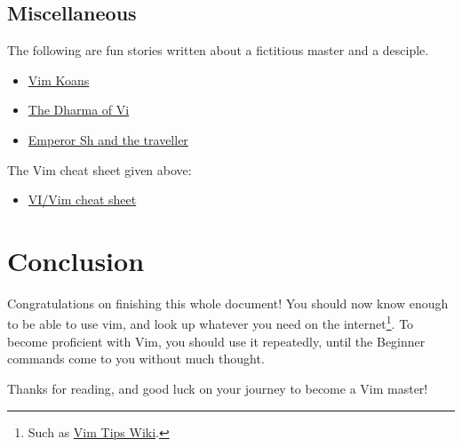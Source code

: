 \documentclass[11pt]{article}
\begin{document}
\subsection{Miscellaneous}
\label{sec:orge2c5ae4}
The following are fun stories written about a fictitious master
and a desciple.
\begin{itemize}
\item \href{https://sanctum.geek.nz/arabesque/vim-koans/}{Vim Koans}
\item \href{https://blog.samwhited.com/2015/04/the-dharma-of-vi/}{The Dharma of Vi}
\item \href{https://sanctum.geek.nz/etc/emperor-sh-and-the-traveller.txt}{Emperor Sh and the traveller}
\end{itemize}

The Vim cheat sheet given above:
\begin{itemize}
\item \href{http://www.viemu.com/a\_vi\_vim\_graphical\_cheat\_sheet\_tutorial.html}{VI/Vim cheat sheet}
\end{itemize}
\section{Conclusion}
\label{sec:orgbfac31d}
Congratulations on finishing this whole document! You should now know enough to
be able to use vim, and look up whatever you need on the internet\footnote{Such as \href{http://vim.wikia.com/wiki/Vim\_Tips\_Wiki}{Vim Tips Wiki}.}. To
become proficient with Vim, you should use it repeatedly, until the Beginner
commands come to you without much thought.

Thanks for reading, and good luck on your journey to become a Vim master!
\end{document}
